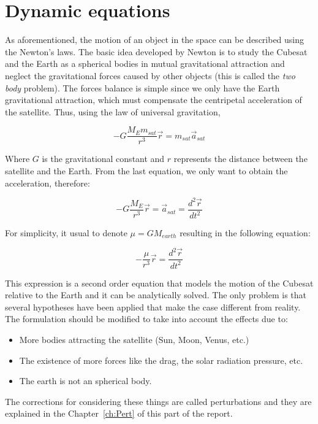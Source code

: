 
\section{Dynamic equations}
As aforementioned, the motion of an object in the space can be described using the Newton's laws. The basic idea developed by Newton is to study the Cubesat and the Earth as a spherical bodies in mutual gravitational attraction and neglect the gravitational forces caused by other objects (this is called the \textit{two body} problem). The forces balance is simple since we only have the Earth gravitational attraction, which must compensate the centripetal acceleration of the satellite. Thus, using the law of universal gravitation,

\begin{equation}
-G\frac{M_{E}m_{sat}}{r^3}\vec{r}=m_{sat}\vec{a}_{sat}
\end{equation}

Where $G$ is the gravitational constant and $r$ represents the distance between the satellite and the Earth. From the last equation, we only want to obtain the acceleration, therefore:

\begin{equation}
-G\frac{M_{E}}{r^3}\vec{r}=\vec{a}_{sat}=\frac{d^2 \vec{r}}{d t^2}
\end{equation}

For simplicity, it usual to denote $\mu=GM_{earth}$ resulting in the following equation:

\begin{equation}\label{eq:a1}
-\frac{\mu}{r^3}\vec{r}=\frac{d^2 \vec{r}}{d t^2}
\end{equation}

This expression is a second order equation that models the motion of the Cubesat relative to the Earth and it can be analytically solved. The only problem is that several hypotheses have been applied that make the case different from reality. The formulation should be modified to take into account the effects due to:

\begin{itemize}
	\item More bodies attracting the satellite (Sun, Moon, Venus, etc.)
	\item The existence of more forces like the drag, the solar radiation pressure, etc.
	\item The earth is not an spherical body.
\end{itemize}

The corrections for considering these things are called perturbations and they are explained in the Chapter~\ref{ch:Pert} of this part of the report.
	